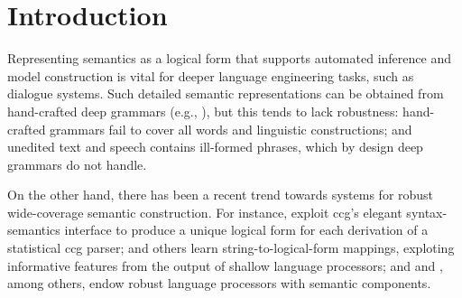 \section{Introduction} \label{sec:intro}

Representing semantics as a logical form that supports automated
inference and model construction is vital for deeper language
engineering tasks, such as dialogue systems.  Such detailed semantic
representations can be obtained from hand-crafted deep grammars (e.g.,
\cite{butt:etal:1999,copestake:flickinger:2000}), but this
tends to lack robustness: hand-crafted grammars fail to cover all
words and linguistic constructions; and unedited text and speech
contains ill-formed phrases, which by design deep grammars do not
handle.

On the other hand, there has been a recent trend towards systems for
robust wide-coverage semantic construction.  For instance,
\cite{bos:etal:2004} exploit
{\sc ccg}'s elegant syntax-semantics interface to produce a unique
logical form for each derivation of
a statistical {\sc ccg} parser;
\cite{zettlemoyer:collins:2007} and others learn
string-to-logical-form mappings, exploting informative features from
the output of
shallow language processors; and \cite{copestake:2003} and
\cite{frank:2004}, among others,
endow robust language processors with semantic components.

